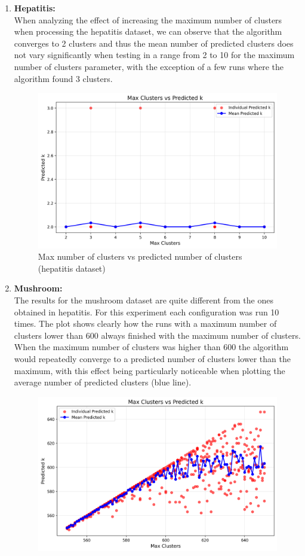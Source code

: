 \begin{enumerate}
    \item \textbf{Hepatitis:}
    \\ When analyzing the effect of increasing the maximum number of clusters when processing the hepatitis dataset, we can observe that the algorithm converges to 2 clusters and thus the mean number of predicted clusters does not vary significantly when testing in a range from 2 to 10 for the maximum number of clusters parameter, with the exception of a few runs where the algorithm found 3 clusters.
    \begin{figure}[H]
        \centering
        \includegraphics[width=0.7\linewidth]{figures/XMeans/hepatitis_max_k_vs_predicted_k.png}
        \caption{Max number of clusters vs predicted number of clusters (hepatitis dataset)}
    \end{figure}
    \item \textbf{Mushroom:}
    \\ The results for the mushroom dataset are quite different from the ones obtained in hepatitis. For this experiment each configuration was run 10 times. The plot shows clearly how the runs with a maximum number of clusters lower than 600 always finished with the maximum number of clusters. When the maximum number of clusters was higher than 600 the algorithm would repeatedly converge to a predicted number of clusters lower than the maximum, with this effect being particularly noticeable when plotting the average number of predicted clusters (blue line).
    \begin{figure}[H]
        \centering
        \includegraphics[width=0.7\linewidth]{figures/XMeans/mushroom_max_k_vs_predicted_k.png}

\end{figure}
\end{enumerate}
